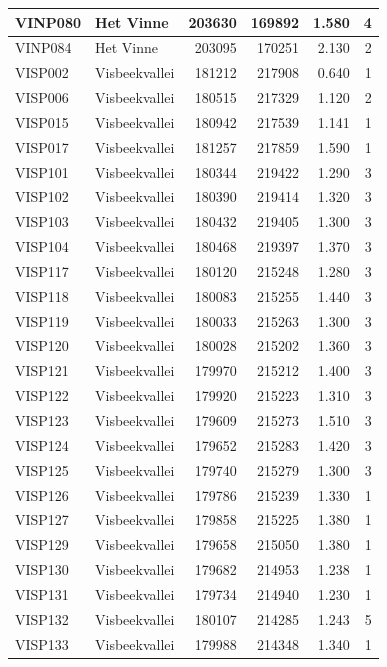 \documentclass[11pt,]{book}
\begin{document}
\begin{table}
\begin{tabular}[t]{l|l|r|r|r|r}
\hline
VINP080 & Het Vinne & 203630 & 169892 & 1.580 & 4\\
\hline
VINP084 & Het Vinne & 203095 & 170251 & 2.130 & 2\\
\hline
VISP002 & Visbeekvallei & 181212 & 217908 & 0.640 & 1\\
\hline
VISP006 & Visbeekvallei & 180515 & 217329 & 1.120 & 2\\
\hline
VISP015 & Visbeekvallei & 180942 & 217539 & 1.141 & 1\\
\hline
VISP017 & Visbeekvallei & 181257 & 217859 & 1.590 & 1\\
\hline
VISP101 & Visbeekvallei & 180344 & 219422 & 1.290 & 3\\
\hline
VISP102 & Visbeekvallei & 180390 & 219414 & 1.320 & 3\\
\hline
VISP103 & Visbeekvallei & 180432 & 219405 & 1.300 & 3\\
\hline
VISP104 & Visbeekvallei & 180468 & 219397 & 1.370 & 3\\
\hline
VISP117 & Visbeekvallei & 180120 & 215248 & 1.280 & 3\\
\hline
VISP118 & Visbeekvallei & 180083 & 215255 & 1.440 & 3\\
\hline
VISP119 & Visbeekvallei & 180033 & 215263 & 1.300 & 3\\
\hline
VISP120 & Visbeekvallei & 180028 & 215202 & 1.360 & 3\\
\hline
VISP121 & Visbeekvallei & 179970 & 215212 & 1.400 & 3\\
\hline
VISP122 & Visbeekvallei & 179920 & 215223 & 1.310 & 3\\
\hline
VISP123 & Visbeekvallei & 179609 & 215273 & 1.510 & 3\\
\hline
VISP124 & Visbeekvallei & 179652 & 215283 & 1.420 & 3\\
\hline
VISP125 & Visbeekvallei & 179740 & 215279 & 1.300 & 3\\
\hline
VISP126 & Visbeekvallei & 179786 & 215239 & 1.330 & 1\\
\hline
VISP127 & Visbeekvallei & 179858 & 215225 & 1.380 & 1\\
\hline
VISP129 & Visbeekvallei & 179658 & 215050 & 1.380 & 1\\
\hline
VISP130 & Visbeekvallei & 179682 & 214953 & 1.238 & 1\\
\hline
VISP131 & Visbeekvallei & 179734 & 214940 & 1.230 & 1\\
\hline
VISP132 & Visbeekvallei & 180107 & 214285 & 1.243 & 5\\
\hline
VISP133 & Visbeekvallei & 179988 & 214348 & 1.340 & 1\\

\end{tabular}
\end{table}
\end{document}
